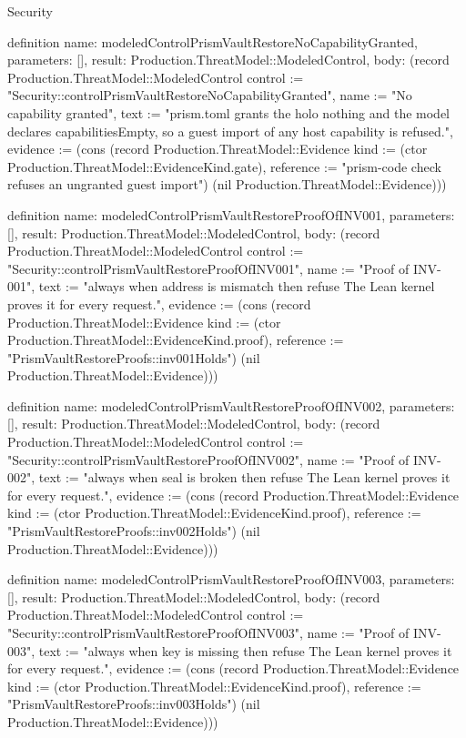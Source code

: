 \begin{lexlean}{Security}
\begin{semanticmodule}
definition{
  name: modeledControlPrismVaultRestoreNoCapabilityGranted,
  parameters: [],
  result: Production.ThreatModel::ModeledControl,
  body: (record Production.ThreatModel::ModeledControl {control := "Security::controlPrismVaultRestoreNoCapabilityGranted", name := "No capability granted", text := "prism.toml grants the holo nothing and the model declares capabilitiesEmpty, so a guest import of any host capability is refused.", evidence := (cons (record Production.ThreatModel::Evidence {kind := (ctor Production.ThreatModel::EvidenceKind.gate), reference := "prism-code check refuses an ungranted guest import"}) (nil Production.ThreatModel::Evidence))})
}

definition{
  name: modeledControlPrismVaultRestoreProofOfINV001,
  parameters: [],
  result: Production.ThreatModel::ModeledControl,
  body: (record Production.ThreatModel::ModeledControl {control := "Security::controlPrismVaultRestoreProofOfINV001", name := "Proof of INV-001", text := "always when address is mismatch then refuse The Lean kernel proves it for every request.", evidence := (cons (record Production.ThreatModel::Evidence {kind := (ctor Production.ThreatModel::EvidenceKind.proof), reference := "PrismVaultRestoreProofs::inv001Holds"}) (nil Production.ThreatModel::Evidence))})
}

definition{
  name: modeledControlPrismVaultRestoreProofOfINV002,
  parameters: [],
  result: Production.ThreatModel::ModeledControl,
  body: (record Production.ThreatModel::ModeledControl {control := "Security::controlPrismVaultRestoreProofOfINV002", name := "Proof of INV-002", text := "always when seal is broken then refuse The Lean kernel proves it for every request.", evidence := (cons (record Production.ThreatModel::Evidence {kind := (ctor Production.ThreatModel::EvidenceKind.proof), reference := "PrismVaultRestoreProofs::inv002Holds"}) (nil Production.ThreatModel::Evidence))})
}

definition{
  name: modeledControlPrismVaultRestoreProofOfINV003,
  parameters: [],
  result: Production.ThreatModel::ModeledControl,
  body: (record Production.ThreatModel::ModeledControl {control := "Security::controlPrismVaultRestoreProofOfINV003", name := "Proof of INV-003", text := "always when key is missing then refuse The Lean kernel proves it for every request.", evidence := (cons (record Production.ThreatModel::Evidence {kind := (ctor Production.ThreatModel::EvidenceKind.proof), reference := "PrismVaultRestoreProofs::inv003Holds"}) (nil Production.ThreatModel::Evidence))})
}


\end{semanticmodule}
\end{lexlean}

